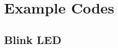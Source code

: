 \documentclass[journal,12pt,twocolumn]{IEEEtran}
\begin{document}





\section{Example Codes}


\subsection{Blink LED}
\end{document}
